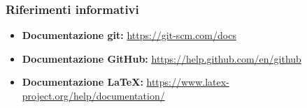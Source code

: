 		\subsubsection{Riferimenti informativi}
			\begin{itemize}
				\item \textbf{Documentazione git: }\url{https://git-scm.com/docs} 
				\item \textbf{Documentazione GitHub: }\url{https://help.github.com/en/github}
				\item \textbf{Documentazione LaTeX: }\url{https://www.latex-project.org/help/documentation/}
			\end{itemize}
		

